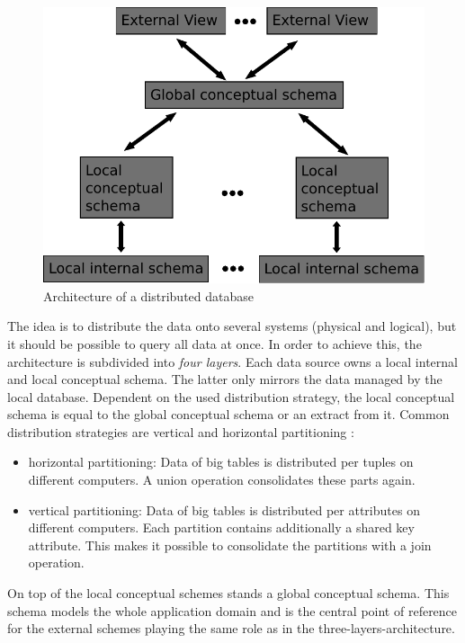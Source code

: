 \begin{figure}[H]
	\begin{center}
		\includegraphics[scale=0.5]{figures/distributedDatabaseArchitecture.pdf}
	\end{center}
	\caption{Architecture of a distributed database \cite[p. 92]{DBLP:books/dp/LeserN2006}}
	\label{DistributedDatabaseArchitecture}
\end{figure}


The idea is to distribute the data onto several systems (physical and logical), but it should be possible to query all data at once. In order to achieve this, the architecture is subdivided into \textit{four layers}. Each data source owns a local internal and local conceptual schema. The latter only mirrors the data managed by the local database. Dependent on the used distribution strategy, the local conceptual schema is equal to the global conceptual schema  or an extract from it. Common distribution strategies are vertical and horizontal partitioning \cite[p. 92]{DBLP:books/dp/LeserN2006}: 
\begin{itemize}
\item horizontal partitioning: Data of big tables is distributed per tuples on different computers. A union operation consolidates these parts again.
\item vertical partitioning: Data of big tables is distributed per attributes on different computers. Each partition contains additionally a shared key attribute. This makes it possible to consolidate the partitions with a join operation.
\end{itemize}
On top of the local conceptual schemes stands a global conceptual schema. This schema models the whole application domain and is the central point of reference for the external schemes playing the same role as in the three-layers-architecture.

